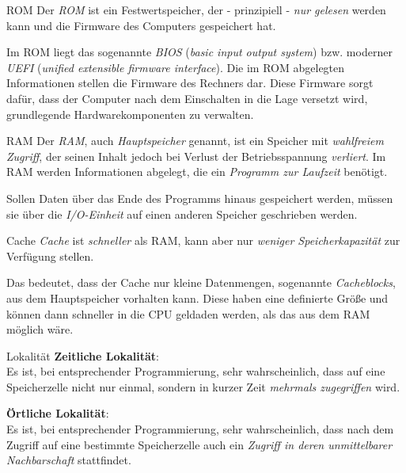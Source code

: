 \documentclass[german]{spicker}
\begin{document}
\begin{defi}{ROM}
    Der \emph{ROM} ist ein Festwertspeicher, der - prinzipiell - \emph{nur gelesen} werden kann und die Firmware des Computers gespeichert hat.

    Im ROM liegt das sogenannte \emph{BIOS} (\emph{basic input output system}) bzw. moderner \emph{UEFI}
    (\emph{unified extensible firmware interface}).
    Die im ROM abgelegten Informationen stellen die Firmware des
    Rechners dar. Diese Firmware sorgt dafür, dass der Computer nach dem Einschalten
    in die Lage versetzt wird, grundlegende Hardwarekomponenten zu verwalten.
\end{defi}

\begin{defi}{RAM}
    Der \emph{RAM},
    auch \emph{Hauptspeicher} genannt, ist ein Speicher mit \emph{wahlfreiem Zugriff}, der seinen
    Inhalt jedoch bei Verlust der Betriebsspannung \emph{verliert}. Im RAM werden Informationen
    abgelegt, die ein \emph{Programm zur Laufzeit} benötigt.

    Sollen Daten
    über das Ende des Programms hinaus gespeichert werden, müssen sie über die
    \emph{I/O-Einheit} auf einen anderen Speicher geschrieben werden.
\end{defi}

\begin{defi}{Cache}
    \emph{Cache} ist \emph{schneller} als RAM, kann aber nur \emph{weniger Speicherkapazität} zur Verfügung stellen.

    Das bedeutet, dass der Cache nur kleine Datenmengen, sogenannte \emph{Cacheblocks}, aus dem Hauptspeicher vorhalten kann.
    Diese haben eine definierte Größe und können dann schneller in die CPU geldaden werden, als das aus dem RAM möglich wäre.
\end{defi}

\begin{defi}{Lokalität}
    \textbf{Zeitliche Lokalität}:\\
    Es ist, bei entsprechender Programmierung, sehr wahrscheinlich, dass
    auf eine Speicherzelle nicht nur einmal, sondern in kurzer Zeit \emph{mehrmals zugegriffen}
    wird.

    \textbf{Örtliche Lokalität}:\\
    Es ist, bei entsprechender Programmierung, sehr wahrscheinlich, dass nach
    dem Zugriff auf eine bestimmte Speicherzelle auch ein \emph{Zugriff in deren unmittelbarer
        \glqq Nachbarschaft\grqq} stattfindet.
\end{defi}
\end{document}
